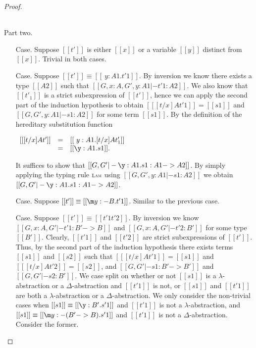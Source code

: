 \begin{proof}
\begin{itemize}
  \end{itemize}

  \ \\
  \noindent Part two.
  \begin{itemize}
  \item[Case.] Suppose $[[t']]$ is either $[[x]]$ or a variable $[[y]]$ distinct from $[[x]]$.  
    Trivial in both cases.

  \item[Case.] Suppose $[[t']] \equiv [[\ y:A1.t'1]]$.  By inversion 
    we know there exists a type $[[A2]]$ such that
    $[[G,x:A,G',y:A1 |- t'1:A2]]$.
    We also know that $[[t'_1]]$ is a strict subexpression of $[[t']]$, hence we can apply the second part of the
    induction hypothesis to obtain
    $[[ [t/x] A t'1]] = [[s1]]$ and $[[G,G',y:A1 |- s1:A2]]$
    for some term $[[s1]]$.  By the definition of the hereditary substitution function 
    \begin{center}
      \begin{math}
        \begin{array}{lll}
          [[ [t/x] A t']] & = & [[\ y:A1.[t/x] A t'_1]] \\
          & = & [[\y:A1.s1]].
        \end{array}
      \end{math}
    \end{center}
    It suffices to show that $[[G,G' |- \y:A1.s1:A1 -> A2]]$.  
    By simply applying the typing rule $\textsc{\scriptsize Lam}$ using
    $[[G,G',y:A1 |- s1:A2]]$ we obtain $[[G,G' |- \y:A1.s1:A1 -> A2]]$.
    
  \item[Case.] Suppose $[[t']] \equiv [[\m y:{-B}.t'1]]$.  Similar to the previous case.

  \item[Case.] Suppose $[[t']] \equiv [[t'1 t'2]]$.  By inversion we know
    $[[G, x:A, G' |- t'1 : B' -> B]]$ and
    $[[G, x:A, G' |- t'2 : B']]$ for some type $[[B']]$.
    Clearly, $[[t'1]]$ and $[[t'2]]$ are strict subexpressions of $[[t']]$.  Thus, by the second part of the
    induction hypothesis there exists terms $[[s1]]$ and $[[s2]]$ such that $[[ [t/x] A t'1]] = [[s1]]$ and
    $[[ [t/x] A t'2]] = [[s2]]$, and $[[G, G' |- s1 : B' -> B']]$ and
    $[[G, G' |- s2 : B']]$.  We case split on whether or not $[[s1]]$ is a $\lambda$-abstraction or
    a $\Delta$-abstraction and $[[t'1]]$ is not, or $[[s1]]$ and $[[t'1]]$ are both a $\lambda$-abstraction or
    a $\Delta$-abstraction.
    We only consider the non-trivial cases when $[[s1]] \equiv [[\y:B'.s'1]]$ and $[[t'1]]$ is not a 
    $\lambda$-abstraction, and $[[s1]] \equiv [[\m y:{-(B'->B)}.s'1]]$ and $[[t'1]]$ is not a 
    $\Delta$-abstraction.  Consider the former.


\end{itemize}
\end{proof}
